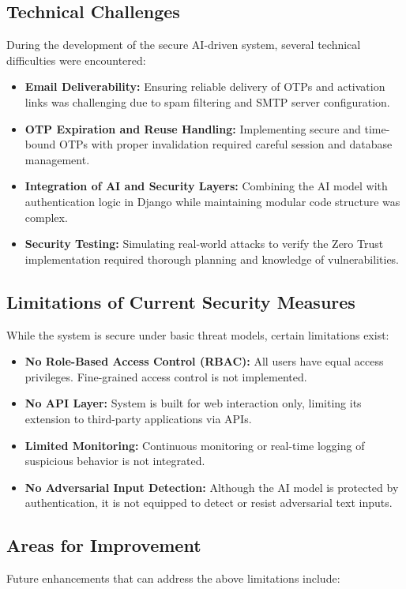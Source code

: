 \documentclass[a4paper,12pt]{article}
\begin{document}
\subsection{Technical Challenges}
During the development of the secure AI-driven system, several technical difficulties were encountered:

\begin{itemize}
    \item \textbf{Email Deliverability:} Ensuring reliable delivery of OTPs and activation links was challenging due to spam filtering and SMTP server configuration.
    \item \textbf{OTP Expiration and Reuse Handling:} Implementing secure and time-bound OTPs with proper invalidation required careful session and database management.
    \item \textbf{Integration of AI and Security Layers:} Combining the AI model with authentication logic in Django while maintaining modular code structure was complex.
    \item \textbf{Security Testing:} Simulating real-world attacks to verify the Zero Trust implementation required thorough planning and knowledge of vulnerabilities.
\end{itemize}

\subsection{Limitations of Current Security Measures}
While the system is secure under basic threat models, certain limitations exist:

\begin{itemize}
    \item \textbf{No Role-Based Access Control (RBAC):} All users have equal access privileges. Fine-grained access control is not implemented.
    \item \textbf{No API Layer:} System is built for web interaction only, limiting its extension to third-party applications via APIs.
    \item \textbf{Limited Monitoring:} Continuous monitoring or real-time logging of suspicious behavior is not integrated.
    \item \textbf{No Adversarial Input Detection:} Although the AI model is protected by authentication, it is not equipped to detect or resist adversarial text inputs.
\end{itemize}

\subsection{Areas for Improvement}
Future enhancements that can address the above limitations include:
\end{document}
